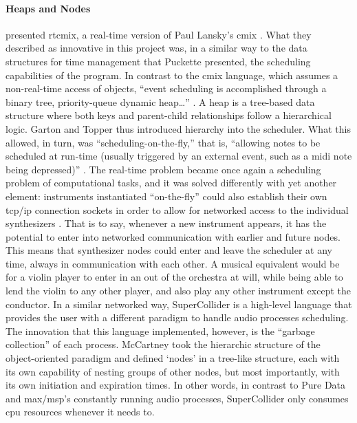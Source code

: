\paragraph{Heaps and Nodes}
\textcite{DBLP:conf/icmc/GartonT97} presented \gls{rtcmix}, a real-time version of Paul Lansky's \gls{cmix} \parencite{DBLP:conf/icmc/Lansky90}. What they described as innovative in this project was, in a similar way to the data structures for time management that Puckette presented, the scheduling capabilities of the program. In contrast to the \gls{cmix} language, which assumes a non-real-time access of objects, ``event scheduling is accomplished through a binary tree, priority-queue dynamic heap\dots '' \parencite{DBLP:conf/icmc/GartonT97}. A heap is a tree-based data structure where both keys and parent-child relationships follow a hierarchical logic. Garton and Topper thus introduced hierarchy into the scheduler. What this allowed, in turn, was ``scheduling-on-the-fly,'' that is, ``allowing notes to be scheduled at run-time (usually triggered by an external event, such as a \gls{midi} note being depressed)'' \parencite{DBLP:conf/icmc/GartonT97}. The real-time problem became once again a scheduling problem of computational tasks, and it was solved differently with yet another element: instruments instantiated ``on-the-fly'' could also establish their own \gls{tcp/ip} connection sockets in order to allow for networked access to the individual synthesizers \parencite{DBLP:conf/icmc/GartonT97}. That is to say, whenever a new instrument appears, it has the potential to enter into networked communication with earlier and future nodes. This means that synthesizer nodes could enter and leave the scheduler at any time, always in communication with each other. A musical equivalent would be for a violin player to enter in an out of the orchestra at will, while being able to lend the violin to any other player, and also play any other instrument except the conductor. In a similar networked way, SuperCollider \parencites{DBLP:conf/icmc/McCartney96}{DBLP:conf/icmc/McCartney98} is a high-level language that provides the user with a different paradigm to handle audio processes scheduling. The innovation that this language implemented, however, is the ``garbage collection'' of each process. McCartney took the hierarchic structure of the object-oriented paradigm and defined `nodes' in a tree-like structure, each with its own capability of nesting groups of other nodes, but most importantly, with its own initiation and expiration times. In other words, in contrast to Pure Data and \gls{max/msp}'s constantly running audio processes, SuperCollider only consumes \gls{cpu} resources whenever it needs to.

